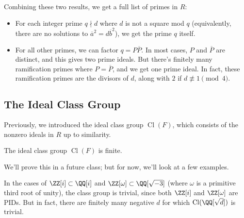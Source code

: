 Combining these two results, we get a full list of primes in $R$:
\begin{itemize}
    \item For each integer prime $q \nmid d$ where $d$ is not a square mod $q$ (equivalently, there are no solutions to $\overline{a}^2 = d\overline{b}^2$), we get the prime $q$ itself. 
    \item For all other primes, we can factor $q = P\overline{P}$. In most cases, $P$ and $\overline{P}$ are distinct, and this gives two prime ideals. But there's finitely many ramification primes where $P = \overline{P}$, and we get one prime ideal. In fact, these ramification primes are the divisors of $d$, along with $2$ if $d \not\equiv 1 \pmod{4}$.
\end{itemize}



\subsection{The Ideal Class Group}

Previously, we introduced the ideal class group $\operatorname{Cl}(F)$, which consists of the nonzero ideals in $R$ up to similarity. 

\begin{theorem}
The ideal class group $\operatorname{Cl}(F)$ is finite.
\end{theorem}

We'll prove this in a future class; but for now, we'll look at a few examples. 

\begin{example}
In the cases of $\ZZ[i] \subset \QQ[i]$ and $\ZZ[\omega] \subset \QQ[\sqrt{-3}]$ (where $\omega$ is a primitive third root of unity), the class group is trivial, since both $\ZZ[i]$ and $\ZZ[\omega]$ are PIDs. But in fact, there are finitely many negative $d$ for which $\operatorname{Cl}(\QQ[\sqrt{d}])$ is trivial. 
\end{example}

